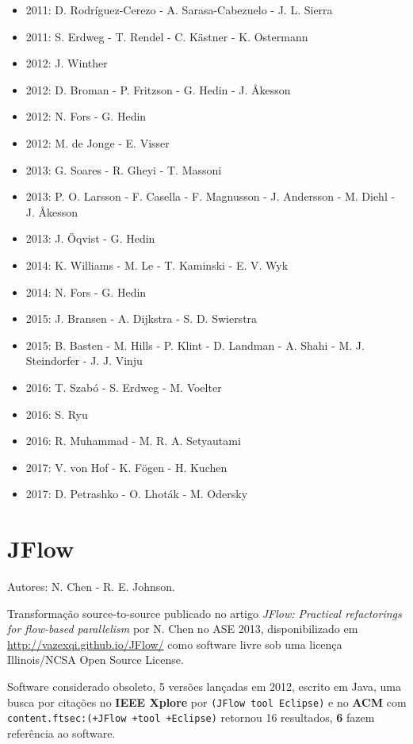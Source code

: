 \begin{itemize}
\item 2011: D. Rodríguez-Cerezo - A. Sarasa-Cabezuelo - J. L. Sierra
\item 2011: S. Erdweg - T. Rendel - C. K\"{a}stner - K. Ostermann
\item 2012: J. Winther
\item 2012: D. Broman - P. Fritzson - G. Hedin - J. Åkesson
\item 2012: N. Fors - G. Hedin
\item 2012: M. de Jonge - E. Visser
\item 2013: G. Soares - R. Gheyi - T. Massoni
\item 2013: P. O. Larsson - F. Casella - F. Magnusson - J. Andersson - M. Diehl - J. Åkesson
\item 2013: J. \"{O}qvist - G. Hedin
\item 2014: K. Williams - M. Le - T. Kaminski - E. V. Wyk
\item 2014: N. Fors - G. Hedin
\item 2015: J. Bransen - A. Dijkstra - S. D. Swierstra
\item 2015: B. Basten - M. Hills - P. Klint - D. Landman - A. Shahi - M. J. Steindorfer - J. J. Vinju
\item 2016: T. Szabó - S. Erdweg - M. Voelter
\item 2016: S. Ryu
\item 2016: R. Muhammad - M. R. A. Setyautami
\item 2017: V. von Hof - K. F\"{o}gen - H. Kuchen
\item 2017: D. Petrashko - O. Lhot\'{a}k - M. Odersky
\end{itemize}

\section{JFlow}

Autores:
N. Chen - R. E. Johnson.

Transformação source-to-source
publicado no artigo {\it JFlow: Practical refactorings for flow-based parallelism}
por N. Chen
no ASE 2013,
disponibilizado em \url{http://vazexqi.github.io/JFlow/}
como software livre
sob uma licença Illinois/NCSA Open Source License.

Software considerado obsoleto,
5 versões lançadas
em 2012,
escrito em Java,
uma busca por citações no {\bf IEEE Xplore} por
\texttt{(JFlow tool Eclipse)}
e no {\bf ACM} com
\texttt{content.ftsec:(+JFlow +tool +Eclipse)}
retornou
16 resultados,
{\bf 6} fazem referência ao software.

